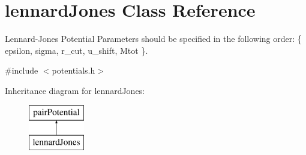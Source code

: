 \hypertarget{classlennard_jones}{\section{lennard\-Jones Class Reference}
\label{classlennard_jones}
}


Lennard-\/\-Jones Potential Parameters should be specified in the following order\-: \{ epsilon, sigma, r\-\_\-cut, u\-\_\-shift, Mtot \}.  




{\ttfamily \#include $<$potentials.\-h$>$}

Inheritance diagram for lennard\-Jones\-:\begin{figure}[H]
\begin{center}
\leavevmode
\includegraphics[height=2.000000cm]{classlennard_jones}
\end{center}
\end{figure}
